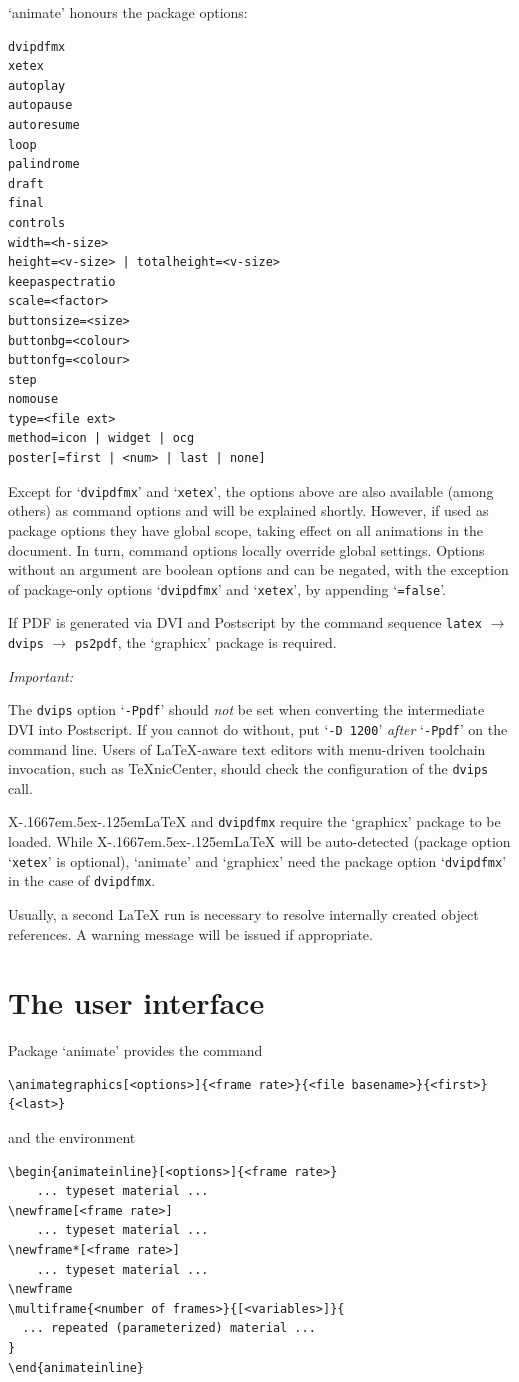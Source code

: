 \documentclass[a4paper]{article}
\def\XeLaTeX{X\kern-.1667em\lower.5ex\hbox{\reflectbox{E}}\kern-.125em\LaTeX}
\begin{document}
`animate' honours the package options:
\begin{verbatim}
dvipdfmx
xetex
autoplay
autopause
autoresume
loop
palindrome
draft
final
controls
width=<h-size>
height=<v-size> | totalheight=<v-size>
keepaspectratio
scale=<factor>
buttonsize=<size>
buttonbg=<colour>
buttonfg=<colour>
step
nomouse
type=<file ext>
method=icon | widget | ocg
poster[=first | <num> | last | none]
\end{verbatim}
Except for `\verb+dvipdfmx+' and `\verb+xetex+', the options above are also available (among others) as command options and will be explained shortly. However, if used as package options they have global scope, taking effect on all animations in the document. In turn, command options locally override global settings. Options without an argument are boolean options and can be negated, with the exception of package-only options `\verb+dvipdfmx+' and `\verb+xetex+', by appending `\verb+=false+'.

If PDF is generated via DVI and Postscript by the command sequence \verb+latex+ $\rightarrow$ \verb+dvips+ $\rightarrow$ \verb+ps2pdf+, the `graphicx' package is required. \begin{animateinline}{1}\strut\emph{Important:}\newframe[3]\end{animateinline} The \verb+dvips+ option `\verb+-Ppdf+' should \emph{not} be set when converting the intermediate DVI into Postscript. If you cannot do without, put `\verb+-D 1200+' \emph{after} `\verb+-Ppdf+' on the command line. Users of \LaTeX-aware text editors with menu-driven toolchain invocation, such as \TeX{}nicCenter, should check the configuration of the \verb+dvips+ call.

\XeLaTeX{} and \verb+dvipdfmx+ require the `graphicx' package to be loaded. While \XeLaTeX{} will be auto-detected (package option `\verb+xetex+' is optional), `animate' and `graphicx' need the package option `\verb+dvipdfmx+' in the case of \verb+dvipdfmx+.

Usually, a second \LaTeX{} run is necessary to resolve internally created object references. A warning message will be issued if appropriate.

\section{The user interface}
Package `animate' provides the command
\begin{verbatim}
\animategraphics[<options>]{<frame rate>}{<file basename>}{<first>}{<last>}
\end{verbatim}
and the environment
\begin{verbatim}
\begin{animateinline}[<options>]{<frame rate>}
    ... typeset material ...
\newframe[<frame rate>]
    ... typeset material ...
\newframe*[<frame rate>]
    ... typeset material ...
\newframe
\multiframe{<number of frames>}{[<variables>]}{
  ... repeated (parameterized) material ...
}
\end{animateinline}
\end{verbatim}
\end{document}
